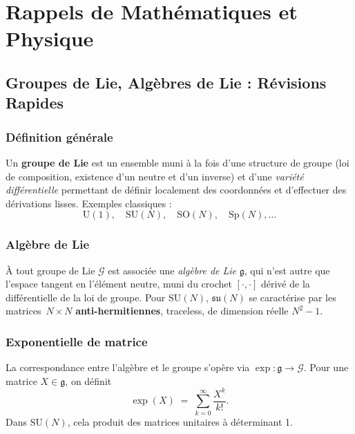 \chapter{Rappels de Mathématiques et Physique}
\label{ann:A}

\section{Groupes de Lie, Algèbres de Lie : Révisions Rapides}
\label{sec:A.1}

\subsection*{Définition générale}
Un \textbf{groupe de Lie} est un ensemble muni à la fois d’une structure de groupe (loi de composition, existence d’un neutre et d’un inverse) et d’une \emph{variété différentielle} permettant de définir localement des coordonnées et d’effectuer des dérivations lisses. Exemples classiques :
\[
\mathrm{U}(1), \quad \mathrm{SU}(N), \quad \mathrm{SO}(N), \quad \mathrm{Sp}(N), \dots
\]

\subsection*{Algèbre de Lie}
À tout groupe de Lie \(\mathcal{G}\) est associée une \emph{algèbre de Lie} \(\mathfrak{g}\), qui n’est autre que l’espace tangent en l’élément neutre, muni du crochet \([\cdot,\cdot]\) dérivé de la \og différentielle de la loi de groupe\fg.  
Pour \(\mathrm{SU}(N)\), \(\mathfrak{su}(N)\) se caractérise par les matrices \(\,N\times N\) \textbf{anti-hermitiennes}, traceless, de dimension réelle \(N^2-1\).

\subsection*{Exponentielle de matrice}
La correspondance entre l’algèbre et le groupe s’opère via \(\exp : \mathfrak{g}\to \mathcal{G}\). Pour une matrice \(X\in \mathfrak{g}\), on définit
\[
\exp(X) \;=\; \sum_{k=0}^\infty \frac{X^k}{k!}.
\]
Dans \(\mathrm{SU}(N)\), cela produit des matrices unitaires à déterminant 1.

